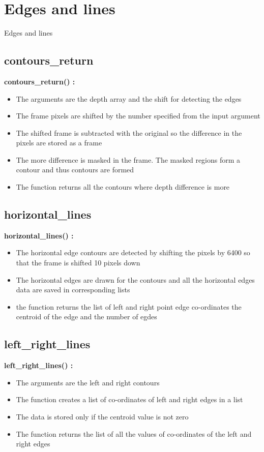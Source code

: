 \documentclass[10pt, a4paper]{beamer}
\begin{document}
\section{Edges and lines}
\begin{frame}[allowframebreaks]{Edges and lines}
  \subsection{contours\_return}
    \textbf{contours\_return() : }
      \begin{itemize}
       \item The arguments are the depth array and the shift for detecting the edges
       \item The frame pixels are shifted by the number specified from the input argument
       \item The shifted frame is subtracted with the original so the difference in the pixels are stored as a frame
       \item The more difference is masked in the frame. The masked regions form a contour and thus contours are formed
       \item The function returns all the contours where depth difference is more
      \end{itemize}
\framebreak
  \subsection{horizontal\_lines}
    \textbf{horizontal\_lines() : }
      \begin{itemize}
       \item The horizontal edge contours are detected by shifting the pixels by 6400 so that the frame is shifted 10 pixels down
       \item The horizontal edges are drawn for the contours and all the horizontal edges data are saved in corresponding lists
       \item the function returns the list of left and right point edge co-ordinates the centroid of the edge and the number of egdes
      \end{itemize}
\framebreak
  \subsection{left\_right\_lines}
    \textbf{left\_right\_lines() : }
      \begin{itemize}
       \item The arguments are the left and right contours
       \item The function creates a list of co-ordinates of left and right edges in a list
       \item The data is stored only if the centroid value is not zero
       \item The function returns the list of all the values of co-ordinates of the left and right edges
      \end{itemize}
\framebreak

\end{frame}
\end{document}
